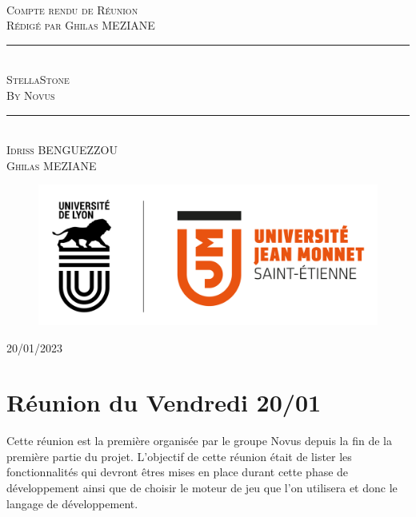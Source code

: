 \documentclass[a4paper, 12pt]{article}
\newcommand{\HRule}{\rule{\linewidth}{0.5mm}}
\begin{document}
\begin{titlepage}
  \begin{sffamily}
  \begin{center}

   
    \textsc{\LARGE }\\[2cm]

    \textsc{\Large Compte rendu de Réunion}\\[1.5cm]
    \textsc{\Medium Rédigé par Ghilas MEZIANE}

    \HRule \\[0.4cm]
    { \huge  \textsc{StellaStone} \\
    \textsc{\Large By Novus}\\ [0.4cm] }
	
    \HRule \\[2cm]
    \textsc {Idriss BENGUEZZOU\\Ghilas MEZIANE}
 \begin{figure}
     \centering
    \includegraphics[scale=0.2]{logoUJM.png}
     \label{fig:ujm_logo}
 \end{figure}

    \vfill

    {\large {} 20/01/2023}

  \end{center}
  \end{sffamily}
\end{titlepage}


\newpage
\tableofcontents

\newpage

\section{Réunion du Vendredi 20/01}

Cette réunion est la première organisée par le groupe Novus depuis la fin de la première partie du projet. L'objectif de cette réunion était de lister les fonctionnalités qui devront êtres mises en place durant cette phase de développement ainsi que de choisir le moteur de jeu que l'on utilisera et donc le langage de développement.
\end{document}
